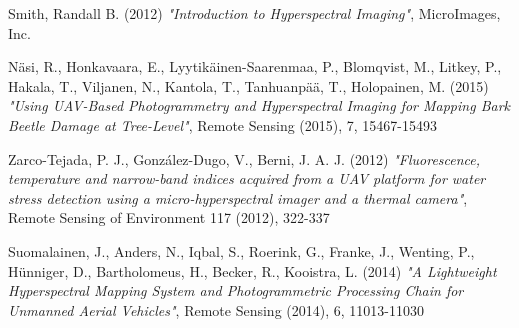 \begin{thebibliography}{25}
	
	Smith, Randall B. (2012)
	\emph{"Introduction to Hyperspectral Imaging"},
	MicroImages, Inc.
	
	Näsi, R., Honkavaara, E., Lyytikäinen-Saarenmaa, P., Blomqvist, M., Litkey, P., Hakala, T., Viljanen, N., Kantola, T., Tanhuanpää, T., Holopainen, M. (2015)
	\emph{"Using UAV-Based Photogrammetry and Hyperspectral Imaging for Mapping Bark Beetle Damage at Tree-Level"},
	Remote Sensing (2015), 7, 15467-15493
	
	Zarco-Tejada, P. J., González-Dugo, V., Berni, J. A. J. (2012)
	\emph{"Fluorescence, temperature and narrow-band indices acquired from a UAV platform for water stress detection using a micro-hyperspectral imager and a thermal camera"},
	Remote Sensing of Environment 117 (2012), 322-337
	
	Suomalainen, J., Anders, N., Iqbal, S., Roerink, G., Franke, J., Wenting, P., Hünniger, D., Bartholomeus, H., Becker, R., Kooistra, L. (2014)
	\emph{"A Lightweight Hyperspectral Mapping System and Photogrammetric Processing Chain for Unmanned Aerial Vehicles"},
	Remote Sensing (2014), 6, 11013-11030
	
\end{thebibliography}